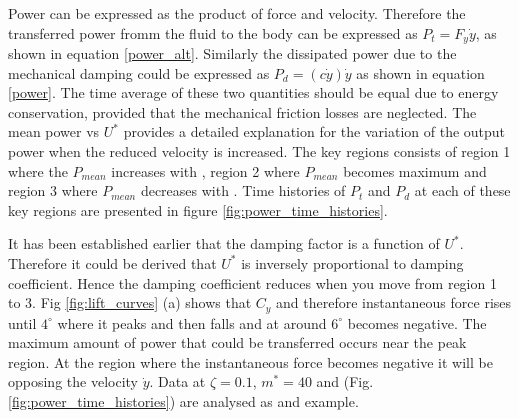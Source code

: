 

Power can be expressed as the product of force and velocity. Therefore the transferred power fromm the fluid to the body can be expressed as $P_t=F_y\dot{y}$, as shown in equation \ref{power_alt}. Similarly the dissipated power due to the mechanical damping could be expressed as $P_d=(c\dot{y})\dot{y}$ as shown in equation \ref{power}. The time average of these two quantities should be equal due to energy conservation, provided that the mechanical friction losses are neglected. The mean power vs $U^*$ provides a detailed explanation for the variation of the output power when the reduced velocity is increased. The key regions consists of region 1 where the $P_{mean}$ increases with \ustar, region 2 where $P_{mean}$ becomes maximum and region 3 where $P_{mean}$ decreases with \ustar. Time histories of $P_t $ and $P_d$ at each of these key regions are presented in figure \ref{fig:power_time_histories}.


It has been established earlier that the damping factor is a function of $U^*$. Therefore it could be derived that $U^*$ is inversely proportional to damping coefficient. Hence the damping coefficient reduces when you move from region 1 to 3. Fig \ref{fig:lift_curves} (a) shows that $C_y$ and therefore instantaneous force rises until $4^\circ$ where it peaks and then falls and at around $6^\circ$ becomes negative. The maximum amount of power that could be transferred occurs near the peak region. At the region where the instantaneous force becomes negative it will be opposing the velocity $\dot{y}$. Data at $\zeta=0.1$, $m^*=40$ and  (Fig.\ref{fig:power_time_histories}) are analysed as and example.


